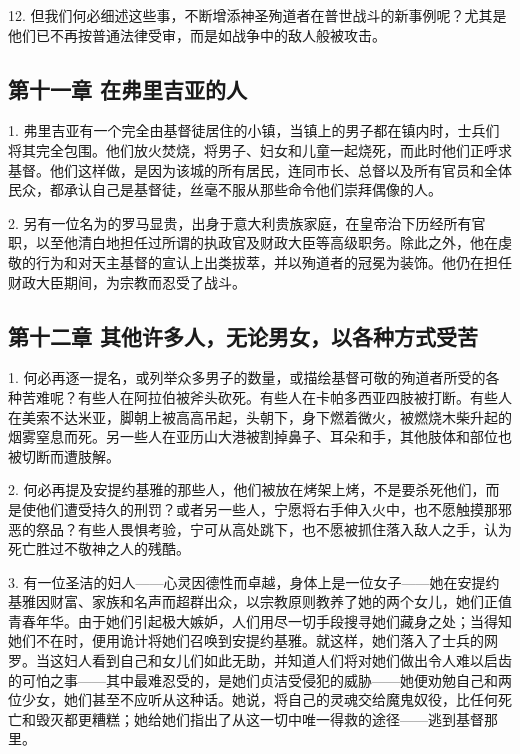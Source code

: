 12. 但我们何必细述这些事，不断增添神圣殉道者在普世战斗的新事例呢？尤其是他们已不再按普通法律受审，而是如战争中的敌人般被攻击。\par


\subsection{第十一章 在弗里吉亚的人}

1. 弗里吉亚有一个完全由基督徒居住的小镇，当镇上的男子都在镇内时，士兵们将其完全包围。他们放火焚烧，将男子、妇女和儿童一起烧死，而此时他们正呼求基督。他们这样做，是因为该城的所有居民，连同市长、总督以及所有官员和全体民众，都承认自己是基督徒，丝毫不服从那些命令他们崇拜偶像的人。\par

2. 另有一位名为的罗马显贵，出身于意大利贵族家庭，在皇帝治下历经所有官职，以至他清白地担任过所谓的执政官及财政大臣等高级职务。除此之外，他在虔敬的行为和对天主基督的宣认上出类拔萃，并以殉道者的冠冕为装饰。他仍在担任财政大臣期间，为宗教而忍受了战斗。\par


\subsection{第十二章 其他许多人，无论男女，以各种方式受苦}

1. 何必再逐一提名，或列举众多男子的数量，或描绘基督可敬的殉道者所受的各种苦难呢？有些人在阿拉伯被斧头砍死。有些人在卡帕多西亚四肢被打断。有些人在美索不达米亚，脚朝上被高高吊起，头朝下，身下燃着微火，被燃烧木柴升起的烟雾窒息而死。另一些人在亚历山大港被割掉鼻子、耳朵和手，其他肢体和部位也被切断而遭肢解。\par

2. 何必再提及安提约基雅的那些人，他们被放在烤架上烤，不是要杀死他们，而是使他们遭受持久的刑罚？或者另一些人，宁愿将右手伸入火中，也不愿触摸那邪恶的祭品？有些人畏惧考验，宁可从高处跳下，也不愿被抓住落入敌人之手，认为死亡胜过不敬神之人的残酷。\par

3. 有一位圣洁的妇人——心灵因德性而卓越，身体上是一位女子——她在安提约基雅因财富、家族和名声而超群出众，以宗教原则教养了她的两个女儿，她们正值青春年华。由于她们引起极大嫉妒，人们用尽一切手段搜寻她们藏身之处；当得知她们不在时，便用诡计将她们召唤到安提约基雅。就这样，她们落入了士兵的网罗。当这妇人看到自己和女儿们如此无助，并知道人们将对她们做出令人难以启齿的可怕之事——其中最难忍受的，是她们贞洁受侵犯的威胁——她便劝勉自己和两位少女，她们甚至不应听从这种话。她说，将自己的灵魂交给魔鬼奴役，比任何死亡和毁灭都更糟糕；她给她们指出了从这一切中唯一得救的途径——逃到基督那里。\par

